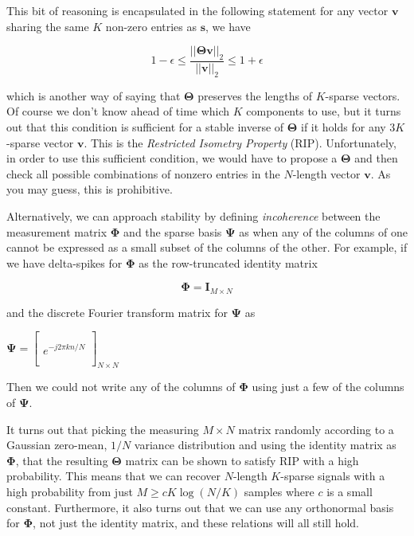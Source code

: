 \documentclass[letterpaper,10pt,english]{/usr/lib/python2.7/site-packages/sphinx/texinputs/sphinxhowto}
\begin{document}
This bit of reasoning is encapsulated in the following statement for any
vector $\mathbf{v}$ sharing the same $K$ non-zero entries as
$\mathbf{s}$, we have

\[1-\epsilon \leq \frac{||  \mathbf{\Theta v} ||_2}{|| \mathbf{v}  ||_2} \leq 1+\epsilon \]

which is another way of saying that $\mathbf{\Theta}$ preserves the
lengths of $K$-sparse vectors. Of course we don't know ahead of time
which $K$ components to use, but it turns out that this condition is
sufficient for a stable inverse of $\mathbf{\Theta}$ if it holds for any
$3K$-sparse vector $\mathbf{v}$. This is the \emph{Restricted Isometry
Property} (RIP). Unfortunately, in order to use this sufficient
condition, we would have to propose a $\mathbf{\Theta}$ and then check
all possible combinations of nonzero entries in the $N$-length vector
$\mathbf{v}$. As you may guess, this is prohibitive.

Alternatively, we can approach stability by defining \emph{incoherence}
between the measurement matrix $\mathbf{\Phi}$ and the sparse basis
$\mathbf{\Psi}$ as when any of the columns of one cannot be expressed as
a small subset of the columns of the other. For example, if we have
delta-spikes for $\mathbf{\Phi}$ as the row-truncated identity matrix

\[\mathbf{\Phi} = \mathbf{I}_{M \times N} \]

and the discrete Fourier transform matrix for $\mathbf{\Psi}$ as

$\mathbf{\Psi} = \begin{bmatrix}\\\\ e^{-j 2\pi k n/N}\\\\ \end{bmatrix}_{N \times N}$

Then we could not write any of the columns of $\mathbf{\Phi}$ using just
a few of the columns of $\mathbf{\Psi}$.

It turns out that picking the measuring $M \times N$ matrix randomly
according to a Gaussian zero-mean, $1/N$ variance distribution and using
the identity matrix as $\mathbf{\Phi}$, that the resulting
$\mathbf{\Theta}$ matrix can be shown to satisfy RIP with a high
probability. This means that we can recover $N$-length $K$-sparse
signals with a high probability from just $M \ge c K \log (N/K)$ samples
where $c$ is a small constant. Furthermore, it also turns out that we
can use any orthonormal basis for $\mathbf{\Phi}$, not just the identity
matrix, and these relations will all still hold.
\end{document}
